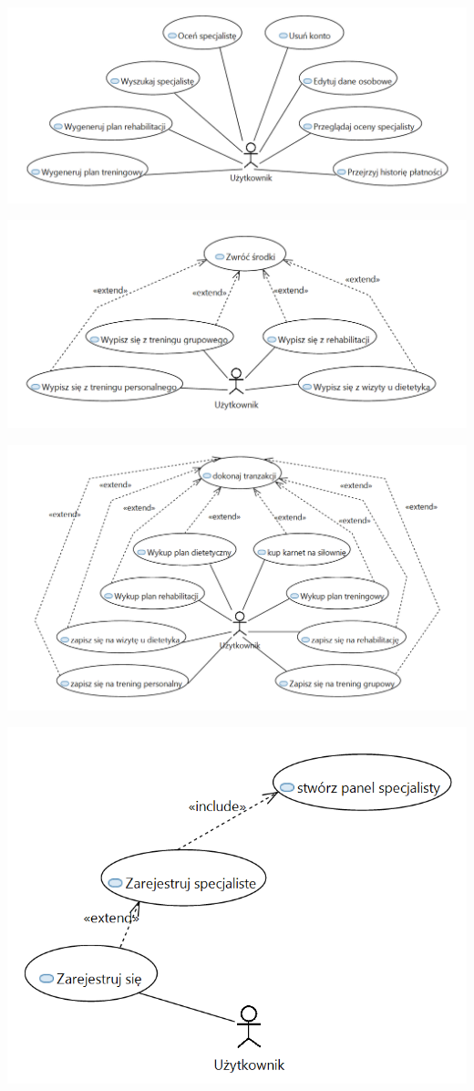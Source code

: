 \documentclass[
]{article}
\begin{document}
{\includegraphics{diagrams/use_cases/uzytkownik.png}}

{\includegraphics{diagrams/use_cases/wypisywanie.png}}

{\includegraphics{diagrams/use_cases/zapisy.png}}

{\includegraphics{diagrams/use_cases/rejestracja.png}}
\end{document}

